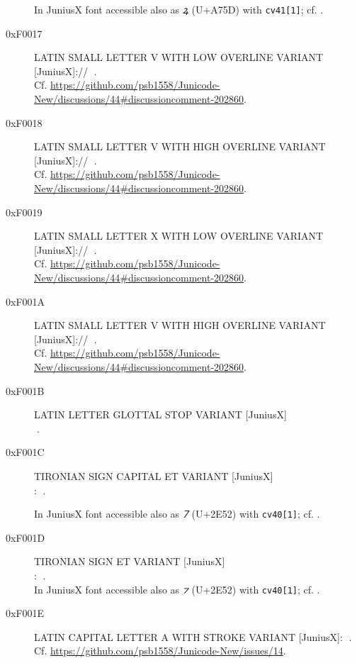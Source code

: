 \documentclass{article}
\newcommand{\Jglyph}[1]{{\relsize{2}\J#1}}
\begin{document}
\begin{description}
  In JuniusX font accessible also as \textit{ꝝ} (U+A75D) with \texttt{cv41[1]};
  cf. \autocite[p. 12]{baker20:_opent_featur_junius_junius}.
\item [0xF0017] LATIN SMALL LETTER V WITH LOW OVERLINE VARIANT [JuniusX]:// 
  \Jglyph{󰀗}.\\ Cf. \url{https://github.com/psb1558/Junicode-New/discussions/44#discussioncomment-202860}.
\item [0xF0018] LATIN SMALL LETTER V WITH HIGH OVERLINE VARIANT [JuniusX]:// 
  \Jglyph{󰀘}.\\ Cf. \url{https://github.com/psb1558/Junicode-New/discussions/44#discussioncomment-202860}.
\item [0xF0019] LATIN SMALL LETTER X WITH LOW OVERLINE VARIANT [JuniusX]:// 
  \Jglyph{󰀙}.\\ Cf. \url{https://github.com/psb1558/Junicode-New/discussions/44#discussioncomment-202860}.
\item [0xF001A] LATIN SMALL LETTER V WITH HIGH OVERLINE VARIANT [JuniusX]:// 
  \Jglyph{󰀚}.\\ Cf. \url{https://github.com/psb1558/Junicode-New/discussions/44#discussioncomment-202860}.
\item [0xF001B] LATIN LETTER GLOTTAL STOP VARIANT [JuniusX]\\
  \Jglyph{󰀛}.\\%
\item [0xF001C] TIRONIAN SIGN CAPITAL ET VARIANT [JuniusX]\\:
\Jglyph{󰀜}.%

In JuniusX font accessible also as \textit{⹒} (U+2E52) with \texttt{cv40[1]};
  cf. \autocite[p. 12]{baker20:_opent_featur_junius_junius}.

\item [0xF001D] TIRONIAN SIGN ET VARIANT [JuniusX]\\:
  \Jglyph{󰀝}.\\%
  In JuniusX font accessible also as \textit{⁊} (U+2E52) with \texttt{cv40[1]};
  cf. \autocite[p. 12]{baker20:_opent_featur_junius_junius}.

\item[0xF001E] LATIN CAPITAL LETTER A WITH STROKE
  VARIANT [JuniusX]: \Jglyph{󰀞}.\\
  Cf. \url{https://github.com/psb1558/Junicode-New/issues/14}.
  

\end{description}
\end{document}

